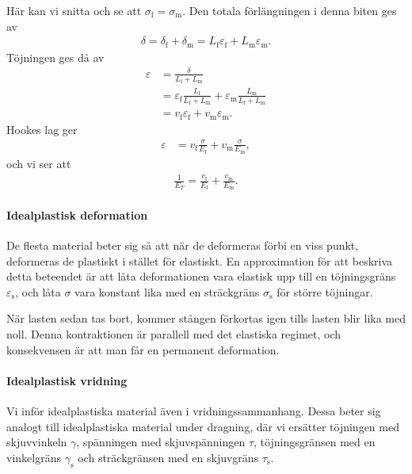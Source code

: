 Här kan vi snitta och se att $\sigma_{\text{f}} = \sigma_{\text{m}}$. Den totala förlängningen i denna biten ges av
\begin{align*}
	\delta = \delta_{\text{f}} + \delta_{\text{m}} = L_{\text{f}}\varepsilon_{\text{f}} + L_{\text{m}}\varepsilon_{\text{m}}.
\end{align*}
Töjningen ges då av
\begin{align*}
	\varepsilon &= \frac{\delta}{L_{\text{f}} + L_{\text{m}}} \\
	            &= \varepsilon_{\text{f}}\frac{L_{\text{f}}}{L_{\text{f}} + L_{\text{m}}} + \varepsilon_{\text{m}}\frac{L_{\text{m}}}{L_{\text{f}} + L_{\text{m}}} \\
	            &= v_{\text{f}}\varepsilon_{\text{f}} + v_{\text{m}}\varepsilon_{\text{m}}.
\end{align*}
Hookes lag ger
\begin{align*}
	\varepsilon &= v_{\text{f}}\frac{\sigma}{E_{\text{f}}} + v_{\text{m}}\frac{\sigma}{E_{\text{m}}},
\end{align*}
och vi ser att
\begin{align*}
	\frac{1}{E_{T}} = \frac{v_{\text{f}}}{E_{\text{f}}} + \frac{v_{\text{m}}}{E_{\text{m}}}.
\end{align*}

\paragraph{Idealplastisk deformation}
De flesta material beter sig så att när de deformeras förbi en viss punkt, deformeras de plastiskt i stället för elastiskt. En approximation för att beskriva detta beteendet är att låta deformationen vara elastisk upp till en töjningsgräns $\varepsilon_{\text{s}}$, och låta $\sigma$ vara konstant lika med en sträckgräns $\sigma_{\text{s}}$ för större töjningar.

När lasten sedan tas bort, kommer stången förkortas igen tills lasten blir lika med noll. Denna kontraktionen är parallell med det elastiska regimet, och konsekvensen är att man får en permanent deformation.

\paragraph{Idealplastisk vridning}
Vi inför idealplastiska material även i vridningssammanhang. Dessa beter sig analogt till idealplastiska material under dragning, där vi ersätter töjningen med skjuvvinkeln $\gamma$, spänningen med skjuvspänningen $\tau$, töjningsgränsen med en vinkelgräns $\gamma_{\text{s}}$ och sträckgränsen med en skjuvgräns $\tau_{\text{s}}$.

